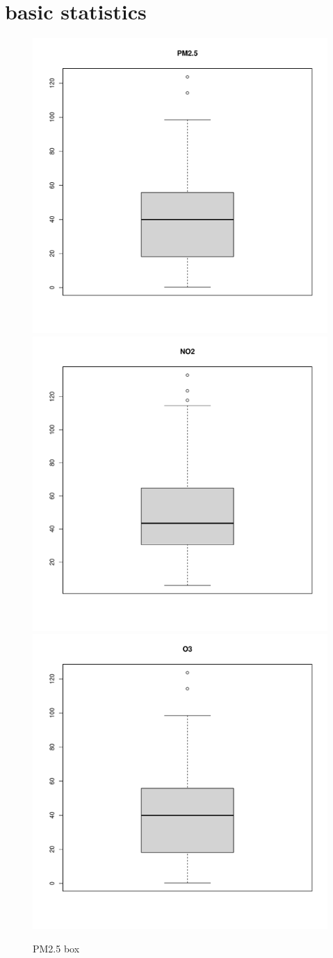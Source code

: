 \documentclass[a4paper,12pt,reqno]{report}
\begin{document}
\section{basic statistics}
\label{sec:basic statistics}
\begin{figure}[H]
    \centering
    \vspace{-0.35cm}
    \includegraphics[width=0.4\linewidth]{figures/PM25_box.pdf}
    \includegraphics[width=0.4\linewidth]{figures/NO2_box.pdf}
    \includegraphics[width=0.4\linewidth]{figures/O3_box.pdf}
    \caption{PM2.5 box}
\end{figure}
\end{document}

